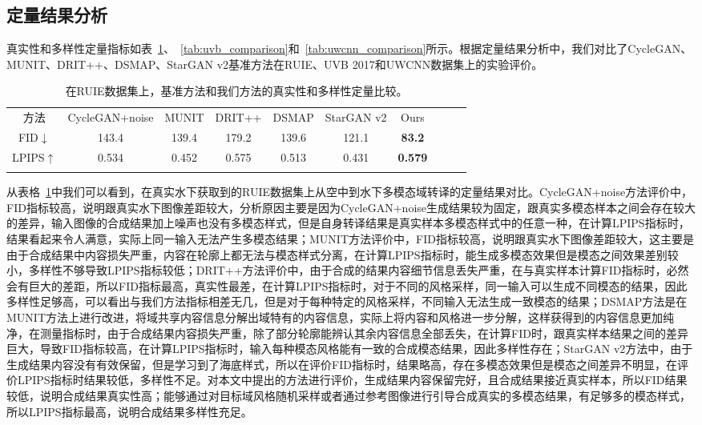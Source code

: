 \subsection{定量结果分析}

真实性和多样性定量指标如表~\ref{tab:ruie_comparison}、~\ref{tab:uvb_comparison}和~\ref{tab:uwcnn_comparison}所示。根据定量结果分析中，我们对比了CycleGAN、MUNIT、DRIT++、DSMAP、StarGAN v2基准方法在RUIE、UVB 2017和UWCNN数据集上的实验评价。

\begin{table}[ht]
\centering
\caption{在RUIE数据集上，基准方法和我们方法的真实性和多样性定量比较。}
  \begin{tabular}{c|ccccccccc}
    \hline\noalign{\smallskip}
    方法 & CycleGAN+noise & MUNIT & DRIT++ & DSMAP & StarGAN v2 & Ours \\
    \noalign{\smallskip}\hline\noalign{\smallskip}
    FID$\downarrow$ & 143.4 & 139.4 & 179.2 & 139.6 & 121.1 & \textbf{83.2} \\
    LPIPS$\uparrow$ & 0.534 & 0.452 & 0.575 & 0.513 & 0.431 & \textbf{0.579} \\
    \noalign{\smallskip}\hline
  \end{tabular}
  \label{tab:ruie_comparison}
\end{table}

从表格~\ref{tab:ruie_comparison}中我们可以看到，在真实水下获取到的RUIE数据集上从空中到水下多模态域转译的定量结果对比。CycleGAN+noise方法评价中，FID指标较高，说明跟真实水下图像差距较大，分析原因主要是因为CycleGAN+noise生成结果较为固定，跟真实多模态样本之间会存在较大的差异，输入图像的合成结果加上噪声也没有多模态样式，但是自身转译结果是真实样本多模态样式中的任意一种，在计算LPIPS指标时，结果看起来令人满意，实际上同一输入无法产生多模态结果；MUNIT方法评价中，FID指标较高，说明跟真实水下图像差距较大，这主要是由于合成结果中内容损失严重，内容在轮廓上都无法与模态样式分离，在计算LPIPS指标时，能生成多模态效果但是模态之间效果差别较小，多样性不够导致LPIPS指标较低；DRIT++方法评价中，由于合成的结果内容细节信息丢失严重，在与真实样本计算FID指标时，必然会有巨大的差距，所以FID指标最高，真实性最差，在计算LPIPS指标时，对于不同的风格采样，同一输入可以生成不同模态的结果，因此多样性足够高，可以看出与我们方法指标相差无几，但是对于每种特定的风格采样，不同输入无法生成一致模态的结果；DSMAP方法是在MUNIT方法上进行改进，将域共享内容信息分解出域特有的内容信息，实际上将内容和风格进一步分解，这样获得到的内容信息更加纯净，在测量指标时，由于合成结果内容损失严重，除了部分轮廓能辨认其余内容信息全部丢失，在计算FID时，跟真实样本结果之间的差异巨大，导致FID指标较高，在计算LPIPS指标时，输入每种模态风格能有一致的合成模态结果，因此多样性存在；StarGAN v2方法中，由于生成结果内容没有有效保留，但是学习到了海底样式，所以在评价FID指标时，结果略高，存在多模态效果但是模态之间差异不明显，在评价LPIPS指标时结果较低，多样性不足。对本文中提出的方法进行评价，生成结果内容保留完好，且合成结果接近真实样本，所以FID结果较低，说明合成结果真实性高；能够通过对目标域风格随机采样或者通过参考图像进行引导合成真实的多模态结果，有足够多的模态样式，所以LPIPS指标最高，说明合成结果多样性充足。

